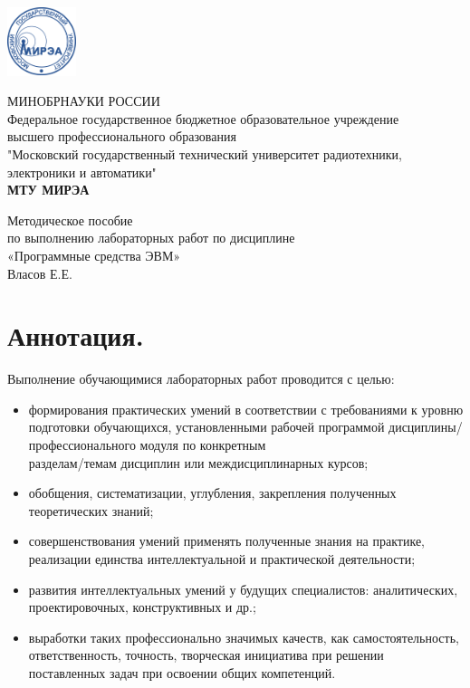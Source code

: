\documentclass[a4paper]{article}
\begin{document}
\begin{titlepage}
\begin{center}
\begin{center}
  \includegraphics[width = 2cm]{logo_mirea.png}
\end{center}
\Large МИНОБРНАУКИ РОССИИ \\
\Large Федеральное государственное бюджетное образовательное учреждение\\
\Large высшего профессионального образования\\
\Large "Московский государственный технический университет радиотехники,\\
\Large электроники и автоматики"\\
\LARGE \bf МТУ МИРЭА \\
\end{center}

\vspace{8em}

\begin{center}
\Large
Методическое пособие\\
по выполнению лабораторных работ по дисциплине\\
«Программные средства ЭВМ»\\
Власов Е.Е.\\
\end{center}

\end{titlepage}

\large
\tableofcontents
\Large
\newpage
\section{\bf Аннотация.}
Выполнение обучающимися лабораторных работ проводится с целью:
\begin{itemize}
  \item формирования практических умений в соответствии с требованиями к уровню подготовки обучающихся, 
  установленными рабочей программой дисциплины/профессионального модуля по конкретным \\
  разделам/темам дисциплин или междисциплинарных курсов;
  \item обобщения, систематизации, углубления, закрепления полученных теоретических знаний;
  \item совершенствования умений применять полученные знания на практике, реализации единства интеллектуальной и практической деятельности;  
  \item развития интеллектуальных умений у будущих специалистов: аналитических, проектировочных, конструктивных и др.;
  \item выработки таких профессионально значимых качеств, как самостоятельность, ответственность, точность, творческая инициатива при
решении поставленных задач при освоении общих компетенций.
\end{itemize}
\newpage
\end{document}
